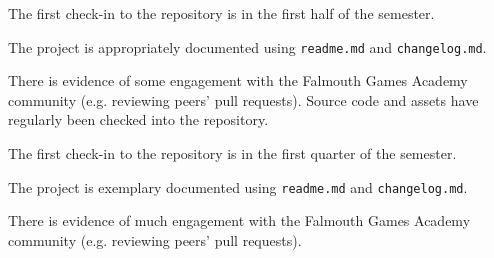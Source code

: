\documentclass{../fal_assignment}
\begin{document}
\begin{markingrubric}
        \par  		The first check-in to the repository is in the first half of the semester.
        \par 		The project is appropriately documented using \texttt{readme.md} and \texttt{changelog.md}.
        \par 		There is evidence of some engagement with the Falmouth Games Academy community (e.g. reviewing peers' pull requests).
        \grade 		Source code and assets have regularly been checked into the repository.
        \par  		The first check-in to the repository is in the first quarter of the semester.
        \par 		The project is exemplary documented using \texttt{readme.md} and \texttt{changelog.md}.
        \par 		There is evidence of much engagement with the Falmouth Games Academy community (e.g. reviewing peers' pull requests).
\end{markingrubric}
\end{document}
